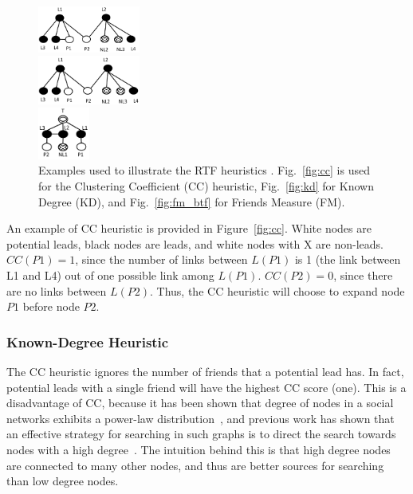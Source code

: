 \documentclass[journal]{IEEEtran}
\begin{document}
\begin{figure}
\centering
\begin{subfloat}[\label{fig:cc}]
  \centering
  \includegraphics[width=0.3\textwidth]{cc.pdf}
\end{subfloat}
\begin{subfloat}[\label{fig:kd}]
  \centering
  \includegraphics[width=0.3\textwidth]{KD_NEW.pdf}
\end{subfloat}
\begin{subfloat}[\label{fig:fm_btf}]
  \centering
  \includegraphics[width=0.15\textwidth]{FM_BTF.pdf}
\end{subfloat}
\caption{Examples used to illustrate the RTF heuristics . Fig.~\ref{fig:cc} is used for the Clustering Coefficient (CC) heuristic, Fig.~\ref{fig:kd} for Known Degree (KD), and Fig.~\ref{fig:fm_btf} for Friends Measure (FM).} 
\end{figure}




An example of CC heuristic is provided in Figure~\ref{fig:cc}. White nodes are potential leads, black nodes are leads, and white nodes with X are non-leads.
$CC(P1)=1$, since the number of links between $L(P1)$ is 1 (the link between L1 and L4) out of one possible link among $L(P1)$.
$CC(P2)=0$, since there are no links between $L(P2)$. Thus, the CC  heuristic will choose to expand node $P1$ before node $P2$.

\subsubsection{Known-Degree Heuristic}
The CC heuristic ignores the number of friends that a potential lead has. In fact, potential leads with a single friend will have the highest CC score (one). This is a disadvantage of CC, because it has been shown that degree of nodes in a social networks exhibits a power-law distribution~\cite{barabasi1999emergence}, and previous work has shown that an effective strategy for searching in such graphs is to direct the search towards nodes with a high degree~\cite{adamic2001searchInPowerLaw}. 
The intuition behind this is that high degree nodes are connected to many other nodes, and thus are better sources for searching than low degree nodes.
\end{document}
